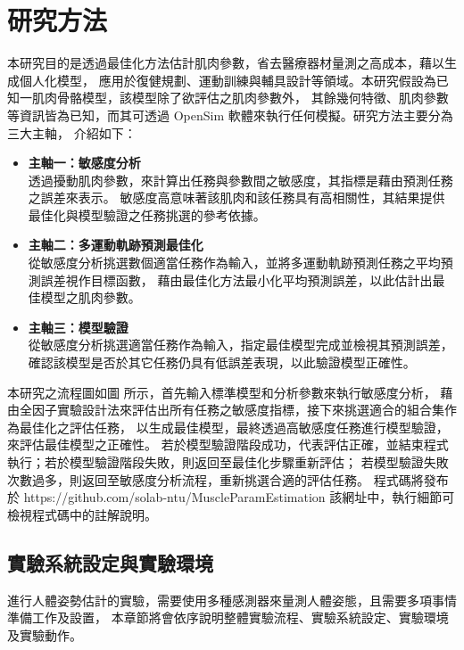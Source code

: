 \chapter{研究方法}
\fontsize{12pt}{18pt}\selectfont

本研究目的是透過最佳化方法估計肌肉參數，省去醫療器材量測之高成本，藉以生成個人化模型，
應用於復健規劃、運動訓練與輔具設計等領域。本研究假設為已知一肌肉骨骼模型，該模型除了欲評估之肌肉參數外，
其餘幾何特徵、肌肉參數等資訊皆為已知，而其可透過 OpenSim 軟體來執行任何模擬。研究方法主要分為三大主軸，
介紹如下：
\begin{itemize}
    \item \textbf{主軸一：敏感度分析}
    \\ 透過擾動肌肉參數，來計算出任務與參數間之敏感度，其指標是藉由預測任務之誤差來表示。
       敏感度高意味著該肌肉和該任務具有高相關性，其結果提供最佳化與模型驗證之任務挑選的參考依據。
    \item \textbf{主軸二：多運動軌跡預測最佳化}
    \\ 從敏感度分析挑選數個適當任務作為輸入，並將多運動軌跡預測任務之平均預測誤差視作目標函數，
       藉由最佳化方法最小化平均預測誤差，以此估計出最佳模型之肌肉參數。   
    \item \textbf{主軸三：模型驗證}
    \\ 從敏感度分析挑選適當任務作為輸入，指定最佳模型完成並檢視其預測誤差，
       確認該模型是否於其它任務仍具有低誤差表現，以此驗證模型正確性。
\end{itemize}

本研究之流程圖如圖 所示，首先輸入標準模型和分析參數來執行敏感度分析，
藉由全因子實驗設計法來評估出所有任務之敏感度指標，接下來挑選適合的組合集作為最佳化之評估任務，
以生成最佳模型，最終透過高敏感度任務進行模型驗證，來評估最佳模型之正確性。
若於模型驗證階段成功，代表評估正確，並結束程式執行；若於模型驗證階段失敗，則返回至最佳化步驟重新評估；
若模型驗證失敗次數過多，則返回至敏感度分析流程，重新挑選合適的評估任務。
程式碼將發布於 https://github.com/solab-ntu/MuscleParamEstimation 該網址中，執行細節可檢視程式碼中的註解說明。

\clearpage

\section{實驗系統設定與實驗環境}\label{ch3_exp_setting}
進行人體姿勢估計的實驗，需要使用多種感測器來量測人體姿態，且需要多項事情準備工作及設置，
本章節將會依序說明整體實驗流程、實驗系統設定、實驗環境及實驗動作。


